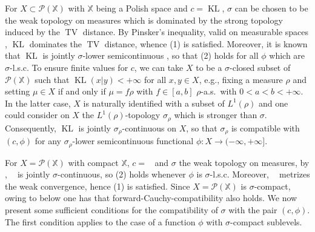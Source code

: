 \documentclass[reqno]{amsart}
\theoremstyle{plain}
\theoremstyle{remark}
\theoremstyle{plain}
\numberwithin{equation}{section}
\theoremstyle{remark}
\newenvironment{continuance}[1]
  {\newcommand\continuanceref{\ref{#1}}\continuancex}
  {\endcontinuancex}
\newcommand{\X}{\mathbb{X}}
\newcommand{\calP}{\mathcal{P}}
\DeclareMathOperator{\TV}{TV}
\DeclareMathOperator{\KL}{KL}
\DeclareMathOperator{\Seps}{S_\epsilon}
\begin{document}
\begin{continuance}{ex:KL}
    For $X\subset\calP(\X)$ with $\X$  being  a Polish space  and  $c=\KL$, $\sigma$ can be chosen to be the weak topology on measures which is dominated by the strong topology induced by the $\TV$ distance. By Pinsker's inequality, 
    valid on measurable spaces \cite[Theorem 31]{van2014renyi}, $\KL$ dominates the $\TV$ distance,  whence {\rm (1)} is satisfied. 
    Moreover, it  is known that $\KL$ is jointly $\sigma$-lower semicontinuous \cite[Theorem 19]{van2014renyi}, so that  {\rm (2)} holds for all $\phi$ which are $\sigma$-l.s.c. To ensure finite values for $c$, we can take $X$ to be a $\sigma$-closed subset of $\calP(\X)$ such that $\KL(x|y)<+\infty$ for all $x,y\in X$, e.g., fixing a measure $\rho$ and setting $\mu\in X$ if and only if $\mu =f\rho$ with $f\in [a,b]$ $\rho$-a.s.\ with $0<a<b<+\infty$. In the latter case, $X$ is naturally identified with a subset of $L^1(\rho)$ and one could consider on $X$ the $L^1(\rho)$-topology $\sigma_\rho$ which is stronger than $\sigma$. Consequently, $\KL$ is jointly $\sigma_\rho$-continuous on $X$, so that $\sigma_\rho$ is compatible with $(c, \phi)$ for any $\sigma_\rho$-lower semicontinuous functional $\phi:X \to (-\infty, + \infty]$.
\end{continuance}

\begin{continuance}{ex:Sinkhorn} 
    For $X=\calP(\X)$ with compact $\X$, $c=\Seps$ and $\sigma$ the weak topology on measures, by \cite[Theorem 1]{feydy2019interpolating}, $\Seps$ is  jointly  $\sigma$-continuous, so ({\rm 2)} holds  whenever  $\phi$ is   $ \sigma$-l.s.c.    Moreover, $\Seps$ metrizes  the  weak convergence, hence {\rm (1)} is satisfied.    Since $X=\calP(\X)$ is $\sigma$-compact,  owing to   below one has that forward-Cauchy-compatibility also holds.  
\end{continuance}
We  now present some sufficient  conditions   for the compatibility of $\sigma$ with the  
 pair  $(c,\phi)$. The first condition  applies to the case of a function $\phi$ with  $\sigma$-compact  sublevels.  
\end{document}
